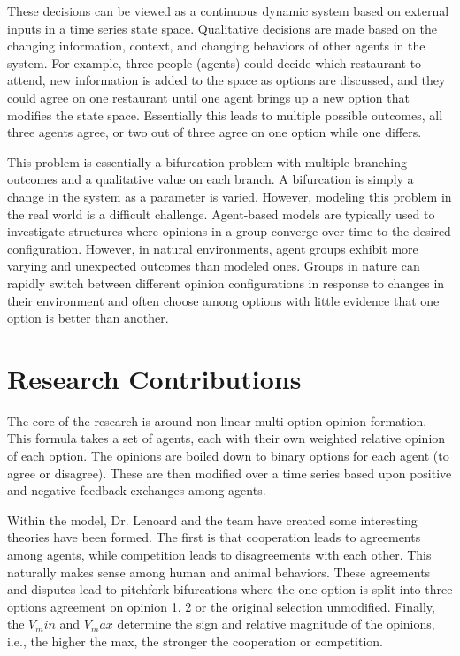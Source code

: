 \documentclass[journal,onecolumn]{IEEEtran}
\begin{document}
These decisions can be viewed as a continuous dynamic system based on external inputs in a time series state space. Qualitative decisions are made based on the changing information, context, and changing behaviors of other agents in the system. For example, three people (agents) could decide which restaurant to attend, new information is added to the space as options are discussed, and they could agree on one restaurant until one agent brings up a new option that modifies the state space. Essentially this leads to multiple possible outcomes, all three agents agree, or two out of three agree on one option while one differs. 

This problem is essentially a bifurcation problem with multiple branching outcomes and a qualitative value on each branch. A bifurcation is simply a change in the system as a parameter is varied. However, modeling this problem in the real world is a difficult challenge. Agent-based models are typically used to investigate structures where opinions in a group converge over time to the desired configuration. However, in natural environments, agent groups exhibit more varying and unexpected outcomes than modeled ones. Groups in nature can rapidly switch between different opinion configurations in response to changes in their environment and often choose among options with little evidence that one option is better than another.

\section{Research Contributions}

The core of the research is around non-linear multi-option opinion formation. This formula takes a set of agents, each with their own weighted relative opinion of each option. The opinions are boiled down to binary options for each agent (to agree or disagree). These are then modified over a time series based upon positive and negative feedback exchanges among agents. 

Within the model, Dr. Lenoard and the team have created some interesting theories have been formed. The first is that cooperation leads to agreements among agents, while competition leads to disagreements with each other. This naturally makes sense among human and animal behaviors. These agreements and disputes lead to pitchfork bifurcations where the one option is split into three options agreement on opinion 1, 2 or the original selection unmodified. Finally, the $V_min$ and $V_max$ determine the sign and relative magnitude of the opinions, i.e., the higher the max, the stronger the cooperation or competition.   
\end{document}
